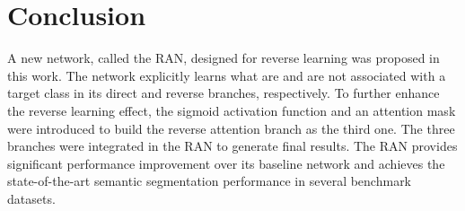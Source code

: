 \documentclass[runningheads]{llncs}
\begin{document}
\section{Conclusion}

A new network, called the RAN, designed for reverse learning was
proposed in this work.  The network explicitly learns what are and are
not associated with a target class in its direct and reverse branches,
respectively.  To further enhance the reverse learning effect, the
sigmoid activation function and an attention mask were introduced to
build the reverse attention branch as the third one.  The three branches
were integrated in the RAN to generate final results.  The RAN provides
significant performance improvement over its baseline network and
achieves the state-of-the-art semantic segmentation performance in
several benchmark datasets. 




\end{document}
